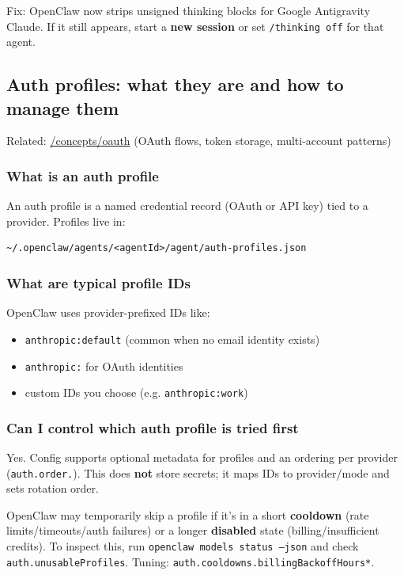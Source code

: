 Fix: OpenClaw now strips unsigned thinking blocks for Google Antigravity Claude. If it still appears, start a \textbf{new session} or set \texttt{/thinking off} for that agent.

\subsection{Auth profiles: what they are and how to manage them}


Related: \href{/concepts/oauth}{/concepts/oauth} (OAuth flows, token storage, multi-account patterns)

\subsubsection{What is an auth profile}


An auth profile is a named credential record (OAuth or API key) tied to a provider. Profiles live in:

\begin{lstlisting}
~/.openclaw/agents/<agentId>/agent/auth-profiles.json
\end{lstlisting}


\subsubsection{What are typical profile IDs}


OpenClaw uses provider-prefixed IDs like:

\begin{itemize}
  \item \texttt{anthropic:default} (common when no email identity exists)
  \item \texttt{anthropic:} for OAuth identities
  \item custom IDs you choose (e.g. \texttt{anthropic:work})
\end{itemize}


\subsubsection{Can I control which auth profile is tried first}


Yes. Config supports optional metadata for profiles and an ordering per provider (\texttt{auth.order.}). This does \textbf{not} store secrets; it maps IDs to provider/mode and sets rotation order.

OpenClaw may temporarily skip a profile if it's in a short \textbf{cooldown} (rate limits/timeouts/auth failures) or a longer \textbf{disabled} state (billing/insufficient credits). To inspect this, run \texttt{openclaw models status --json} and check \texttt{auth.unusableProfiles}. Tuning: \texttt{auth.cooldowns.billingBackoffHours*}.

